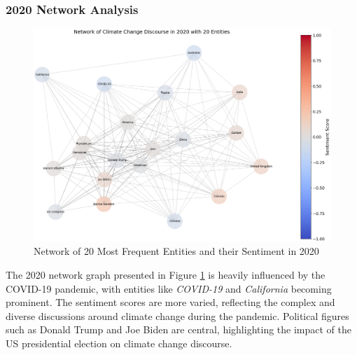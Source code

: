 \subsubsection{2020 Network Analysis}
\begin{figure}[h]
    \includegraphics[width=\textwidth]{images/topic_details/entities/network_analysis_top20_2020_spring.png}
    \caption{Network of 20 Most Frequent Entities and their Sentiment in 2020}
    \label{fig:network_2020}
\end{figure}
The 2020 network graph presented in Figure \ref{fig:network_2020} is heavily influenced by the COVID-19 pandemic, with entities like \emph{COVID-19} and \emph{California} becoming prominent. The sentiment scores are more varied, reflecting the complex and diverse discussions around climate change during the pandemic. Political figures such as Donald Trump and Joe Biden are central, highlighting the impact of the US presidential election on climate change discourse.

